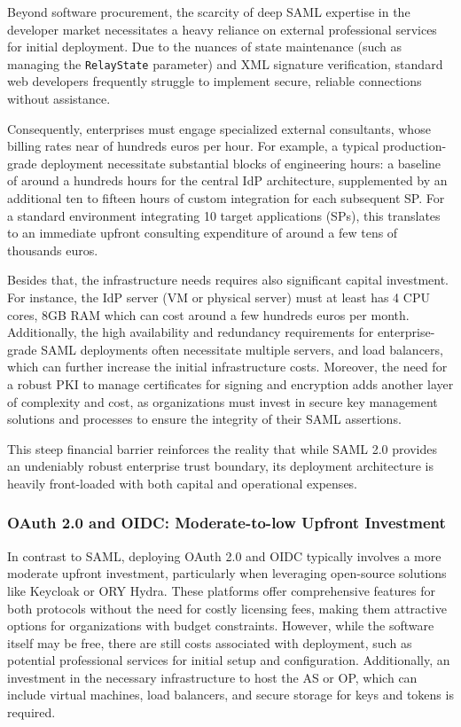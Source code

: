 \documentclass[../memoire.tex]{subfiles}
\begin{document}
Beyond software procurement, the scarcity of deep SAML expertise in the developer market necessitates a heavy reliance on external professional services for initial deployment. Due to the nuances of state maintenance (such as managing the \texttt{RelayState} parameter) and XML signature verification, standard web developers frequently struggle to implement secure, reliable connections without assistance. 

Consequently, enterprises must engage specialized external consultants, whose billing rates near of hundreds euros per hour. For example, a typical production-grade deployment necessitate substantial blocks of engineering hours: a baseline of around a hundreds hours for the central IdP architecture, supplemented by an additional ten to fifteen hours of custom integration for each subsequent SP. For a standard environment integrating 10 target applications (SPs), this translates to an immediate upfront consulting expenditure of around a few tens of thousands euros. 

Besides that, the infrastructure needs requires also significant capital investment. For instance, the IdP server (VM or physical server) must at least has 4 CPU cores, 8GB RAM which can cost around a few hundreds euros per month. Additionally, the high availability and redundancy requirements for enterprise-grade SAML deployments often necessitate multiple servers, and load balancers, which can further increase the initial infrastructure costs. Moreover, the need for a robust PKI to manage certificates for signing and encryption adds another layer of complexity and cost, as organizations must invest in secure key management solutions and processes to ensure the integrity of their SAML assertions.

This steep financial barrier reinforces the reality that while SAML 2.0 provides an undeniably robust enterprise trust boundary, its deployment architecture is heavily front-loaded with both capital and operational expenses.

\subsubsection{OAuth 2.0 and OIDC: Moderate-to-low Upfront Investment}

In contrast to SAML, deploying OAuth 2.0 and OIDC typically involves a more moderate upfront investment, particularly when leveraging open-source solutions like Keycloak or ORY Hydra. These platforms offer comprehensive features for both protocols without the need for costly licensing fees, making them attractive options for organizations with budget constraints. However, while the software itself may be free, there are still costs associated with deployment, such as potential professional services for initial setup and configuration. Additionally, an investment in the necessary infrastructure to host the AS or OP, which can include virtual machines, load balancers, and secure storage for keys and tokens is required. 
\end{document}
